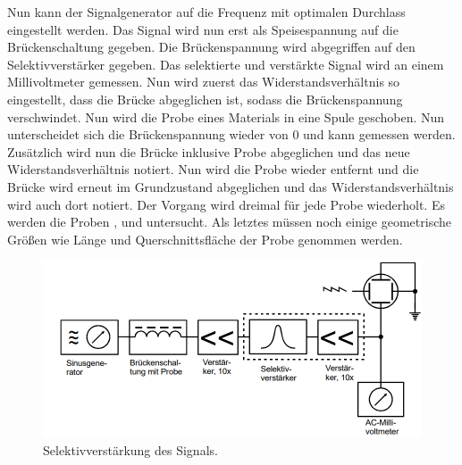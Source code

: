 \noindent Nun kann der Signalgenerator auf die Frequenz mit optimalen Durchlass eingestellt werden.
Das Signal wird nun erst als Speisespannung auf die Brückenschaltung gegeben. Die Brückenspannung wird abgegriffen auf den Selektivverstärker gegeben.
Das selektierte und verstärkte Signal wird an einem Millivoltmeter gemessen. Nun wird zuerst das Widerstandsverhältnis so eingestellt, dass die Brücke abgeglichen ist, sodass
die Brückenspannung verschwindet. Nun wird die Probe eines Materials in eine Spule geschoben. Nun unterscheidet sich die Brückenspannung wieder
von 0 und kann gemessen werden. Zusätzlich wird nun die Brücke inklusive Probe abgeglichen und das neue
Widerstandsverhältnis notiert. Nun wird die Probe wieder entfernt und die Brücke wird erneut im Grundzustand abgeglichen und das Widerstandsverhältnis wird auch dort notiert.
Der Vorgang wird dreimal für jede Probe wiederholt. Es werden die Proben , und  untersucht.
Als letztes müssen noch einige geometrische Größen wie Länge und Querschnittsfläche der Probe genommen werden.
\begin{figure}[H]
    \centering
    \includegraphics[scale=0.7]{content/Messschaltung.png}
    \caption{Selektivverstärkung des Signals.}
    \label{fig:Messung}
\end{figure}
